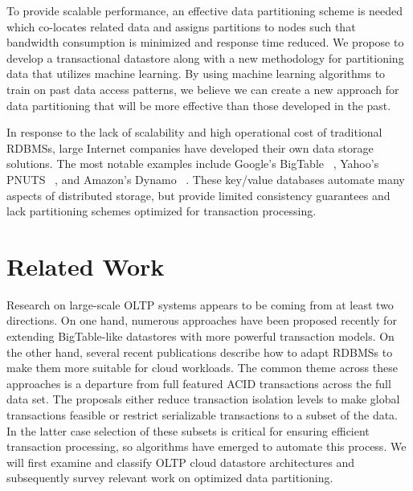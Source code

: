 \documentclass[10pt,final,journal]{IEEEtran}
\begin{document}
To provide scalable performance, an effective data partitioning scheme is needed which co-locates related data and assigns partitions to nodes such that bandwidth consumption is minimized and response time reduced. We propose to develop a transactional datastore along with a new methodology for partitioning data that utilizes machine learning. By using machine learning algorithms to train on past data access patterns, we believe we can create a new approach for data partitioning that will be more effective than those developed in the past.

In response to the lack of scalability and high operational cost of traditional RDBMSs, large Internet companies have developed their own data storage solutions. The most notable examples include Google's BigTable ~\cite{Chang:2006:BDS:1267308.1267323}, Yahoo's PNUTS ~\cite{Cooper:2008:PYH:1454159.1454167}, and Amazon's Dynamo ~\cite{DeCandia:2007:DAH:1323293.1294281}. These key/value databases automate many aspects of distributed storage, but provide limited consistency guarantees and lack partitioning schemes optimized for transaction processing.

\section{Related Work}
Research on large-scale OLTP systems appears to be coming from at least two directions. On one hand, numerous approaches have been proposed recently for extending BigTable-like datastores with more powerful transaction models. On the other hand, several recent publications describe how to adapt RDBMSs to make them more suitable for cloud workloads. The common theme across these approaches is a departure from full featured ACID transactions across the full data set. The proposals either reduce transaction isolation levels to make global transactions feasible or restrict serializable transactions to a subset of the data. In the latter case selection of these subsets is critical for ensuring efficient transaction processing, so algorithms have emerged to automate this process. We will first examine and classify OLTP cloud datastore architectures and subsequently survey relevant work on optimized data partitioning.
\end{document}
